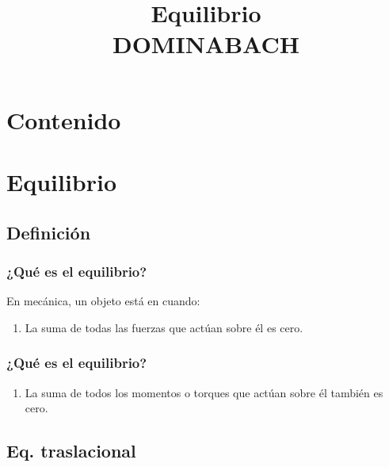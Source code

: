 \documentclass[14pt]{beamer}
\title{\Large{Equilibrio} \\ \normalsize{DOMINABACH}}
\date{}
\begin{document}
\maketitle

\section*{Contenido}

\section{Equilibrio}
\subsection{Definición}

\begin{frame}
\frametitle{¿Qué es el equilibrio?}
En mecánica, un objeto está en  cuando:
\pause
{}
\begin{enumerate}[<+->]
\item La suma de todas las fuerzas que actúan sobre él es cero.
\seti
\end{enumerate}
\end{frame}
\begin{frame}
\frametitle{¿Qué es el equilibrio?}
\begin{enumerate}[<+->]
\conti
\item La suma de todos los momentos o torques que actúan sobre él también es cero.
\end{enumerate}
\end{frame}

\subsection{Eq. traslacional}
\end{document}

